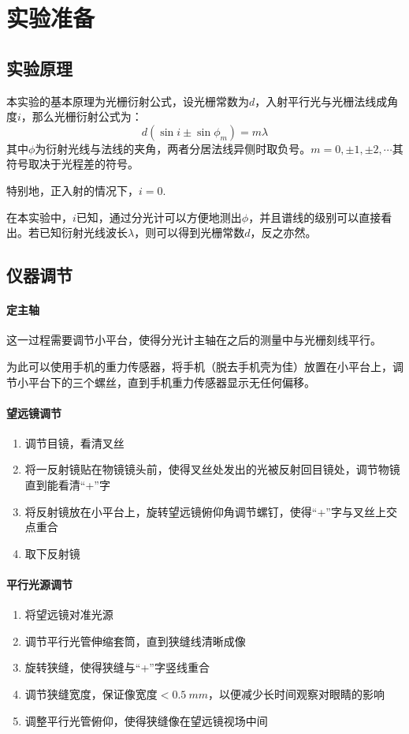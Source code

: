 \documentclass[UTF8,a4paper]{article}%
\begin{document}
\section{实验准备}
\subsection{实验原理}
本实验的基本原理为光栅衍射公式，设光栅常数为$d$，入射平行光与光栅法线成角度$i$，那么光栅衍射公式为：
$$d(\sin i\pm\sin\phi_m)=m\lambda$$
其中$\phi$为衍射光线与法线的夹角，两者分居法线异侧时取负号。$m=0,\pm1,\pm2,\cdots$其符号取决于光程差的符号。

特别地，正入射的情况下，$i=0$.

在本实验中，$i$已知，通过分光计可以方便地测出$\phi$，并且谱线的级别可以直接看出。若已知衍射光线波长$\lambda$，则可以得到光栅常数$d$，反之亦然。
\subsection{仪器调节}
\paragraph{定主轴}
这一过程需要调节小平台，使得分光计主轴在之后的测量中与光栅刻线平行。

为此可以使用手机的重力传感器，将手机（脱去手机壳为佳）放置在小平台上，调节小平台下的三个螺丝，直到手机重力传感器显示无任何偏移。
\paragraph{望远镜调节}
\begin{enumerate}
    \item 调节目镜，看清叉丝
    \item 将一反射镜贴在物镜镜头前，使得叉丝处发出的光被反射回目镜处，调节物镜直到能看清“+”字
    \item 将反射镜放在小平台上，旋转望远镜俯仰角调节螺钉，使得“+”字与叉丝上交点重合
    \item 取下反射镜
\end{enumerate}
\paragraph{平行光源调节}
\begin{enumerate}
    \item 将望远镜对准光源
    \item 调节平行光管伸缩套筒，直到狭缝线清晰成像
    \item 旋转狭缝，使得狭缝与“+”字竖线重合
    \item 调节狭缝宽度，保证像宽度$<\qty{0.5}{mm}$，以便减少长时间观察对眼睛的影响
    \item 调整平行光管俯仰，使得狭缝像在望远镜视场中间
\end{enumerate}
\end{document}
